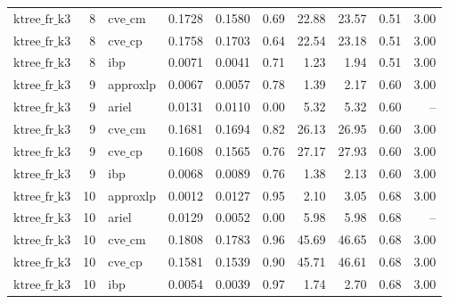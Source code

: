 \begin{table}[ht]
\begin{tabular}{lrlrrrrrrr}
$\text{ktree\_fr\_k3}$ & 8 & $\text{cve\_cm}$ & 0.1728 & 0.1580 & 0.69 & 22.88 & 23.57 & 0.51 & 3.00 \\
$\text{ktree\_fr\_k3}$ & 8 & $\text{cve\_cp}$ & 0.1758 & 0.1703 & 0.64 & 22.54 & 23.18 & 0.51 & 3.00 \\
$\text{ktree\_fr\_k3}$ & 8 & ibp & 0.0071 & 0.0041 & 0.71 & 1.23 & 1.94 & 0.51 & 3.00 \\
$\text{ktree\_fr\_k3}$ & 9 & approxlp & 0.0067 & 0.0057 & 0.78 & 1.39 & 2.17 & 0.60 & 3.00 \\
$\text{ktree\_fr\_k3}$ & 9 & ariel & 0.0131 & 0.0110 & 0.00 & 5.32 & 5.32 & 0.60 & -- \\
$\text{ktree\_fr\_k3}$ & 9 & $\text{cve\_cm}$ & 0.1681 & 0.1694 & 0.82 & 26.13 & 26.95 & 0.60 & 3.00 \\
$\text{ktree\_fr\_k3}$ & 9 & $\text{cve\_cp}$ & 0.1608 & 0.1565 & 0.76 & 27.17 & 27.93 & 0.60 & 3.00 \\
$\text{ktree\_fr\_k3}$ & 9 & ibp & 0.0068 & 0.0089 & 0.76 & 1.38 & 2.13 & 0.60 & 3.00 \\
$\text{ktree\_fr\_k3}$ & 10 & approxlp & 0.0012 & 0.0127 & 0.95 & 2.10 & 3.05 & 0.68 & 3.00 \\
$\text{ktree\_fr\_k3}$ & 10 & ariel & 0.0129 & 0.0052 & 0.00 & 5.98 & 5.98 & 0.68 & -- \\
$\text{ktree\_fr\_k3}$ & 10 & $\text{cve\_cm}$ & 0.1808 & 0.1783 & 0.96 & 45.69 & 46.65 & 0.68 & 3.00 \\
$\text{ktree\_fr\_k3}$ & 10 & $\text{cve\_cp}$ & 0.1581 & 0.1539 & 0.90 & 45.71 & 46.61 & 0.68 & 3.00 \\
$\text{ktree\_fr\_k3}$ & 10 & ibp & 0.0054 & 0.0039 & 0.97 & 1.74 & 2.70 & 0.68 & 3.00 \\
\bottomrule
\end{tabular}
\end{table}
